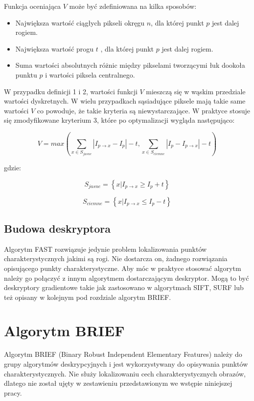 Funkcja oceniająca $V$ może być zdefiniowana na kilka sposobów:
\begin{itemize}
\item Największa wartość ciągłych pikseli okręgu $n$, dla której punkt $p$ jest dalej rogiem.
\item Największa wartość progu $t$ , dla której punkt $p$ jest dalej rogiem.
\item Suma wartości absolutnych różnic między pikselami tworzącymi łuk dookoła punktu $p$ i wartości piksela centralnego.
\end{itemize}

W przypadku definicji 1 i 2, wartości funkcji $V$ mieszczą się w wąskim przedziale wartości dyskretnych. W wielu przypadkach sąsiadujące piksele mają takie same wartości $V$ co powoduje, że takie kryteria są niewystarczające. W praktyce stosuje się zmodyfikowane kryterium 3, które po optymalizacji wygląda następująco:


\begin{equation}
V = max \left( \sum_{x\in S_{jasne}} |I_{p \rightarrow x}-I_p| - t , \sum_{x\in S_{ciemne}} |I_p-I_{p \rightarrow x}| - t  \right)
\end{equation}

gdzie:

\begin{equation}
S_{jasne} = \left\lbrace x|I_{p\rightarrow x} \geq I_{p} + t \right\rbrace
\end{equation}

\begin{equation}
S_{ciemne} = \left\lbrace x|I_{p\rightarrow x} \leq I_{p} - t \right\rbrace
\end{equation}

\subsection{Budowa deskryptora}
Algorytm FAST rozwiązuje jedynie problem lokalizowania punktów charakterystycznych jakimi są rogi. Nie dostarcza on, żadnego rozwiązania opisującego punkty charakterystyczne. Aby móc w praktyce stosować algorytm należy go połączyć z innym algorytmem dostarczającym deskryptor. Mogą to być deskryptory gradientowe takie jak zastosowano w algorytmach SIFT, SURF lub też opisany w kolejnym pod rozdziale algorytm BRIEF.
\FloatBarrier
\newpage
\section{Algorytm BRIEF}
Algorytm BRIEF (Binary Robust Independent Elementary Features) \cite{B1} \cite{B2} należy do grupy algorytmów deskrypcyjnych i jest wykorzystywany do opisywania punktów charakterystycznych. Nie służy lokalizowaniu cech charakterystycznych obrazów, dlatego nie został ujęty w zestawieniu przedstawionym we wstępie niniejszej pracy.

